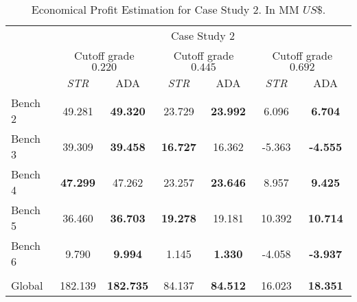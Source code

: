 \begin{table}
	\caption[Economic Profit Estimation for Case Study 2]{Economical Profit Estimation for Case Study 2. In MM $US\$$.}
	\label{tab:profit_global_classification_cs2_PII}
	\begin{center}
		\begin{tabular}{lcccccc}\toprule
			& \multicolumn{6}{c}{Case Study 2} \\
			& \multicolumn{2}{c}{Cutoff grade $0.220$}& \multicolumn{2}{c}{Cutoff grade $0.445$} & \multicolumn{2}{c}{Cutoff grade $0.692$}\\
			& {\emph{STR} } & {ADA} & {\emph{STR}} & {ADA} & {\emph{STR} } & {ADA}\\\midrule
			Bench 2 & 49.281  & \textbf{49.320} &   23.729   &  \textbf{23.992} &   6.096 &  \textbf{6.704} \\
			Bench 3 & 39.309 & \textbf{39.458} &  \textbf{16.727} &  16.362 &  -5.363 &  \textbf{-4.555}\\
			Bench 4 & \textbf{47.299} & 47.262 &  23.257 &  \textbf{23.646} &  8.957 &  \textbf{9.425}\\
			Bench 5 & 36.460  & \textbf{36.703}  &  \textbf{19.278} &   19.181 &   10.392 &  \textbf{10.714}\\
			Bench 6 & 9.790 & \textbf{9.994}  &  1.145 &  \textbf{1.330} &  -4.058 &  \textbf{-3.937}\\
			\hline \\
			Global  & 182.139  & \textbf{182.735}   &  84.137 &  \textbf{84.512} &  16.023 &  \textbf{18.351} \\
			\bottomrule
		\end{tabular}
	\end{center}
\end{table}

